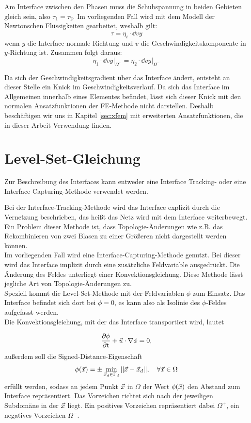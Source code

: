 Am Interface zwischen den Phasen muss die Schubspannung in beiden Gebieten gleich sein, also $\tau_1 = \tau_2$. Im vorliegenden Fall wird mit dem Modell der Newtonschen Flüssigkeiten gearbeitet, weshalb gilt: 
\[\tau = \eta_i\cdot\dd{v}{y}\]
wenn $y$ die Interface-normale Richtung und $v$ die Geschwindigkeitskomponente in $y$-Richtung ist. Zusammen folgt daraus:
\[\eta_1\cdot\dd{v}{y}\biggr|_{\Omega^+} = \eta_2\cdot\dd{v}{y}\biggr|_{\Omega^-}\]

Da sich der Geschwindigkeitsgradient über das Interface ändert, entsteht an dieser Stelle ein Knick im Geschwindigkeitsverlauf. Da sich das Interface im Allgemeinen innerhalb eines Elementes befindet, lässt sich dieser Knick mit den normalen Ansatzfunktionen der FE-Methode nicht darstellen. Deshalb beschäftigen wir uns in Kapitel \ref{sec:xfem} mit erweiterten Ansatzfunktionen, die in dieser Arbeit Verwendung finden.

\section{Level-Set-Gleichung}
Zur Beschreibung des Interfaces kann entweder eine Interface Tracking- oder eine Interface Capturing-Methode verwendet werden.

Bei der Interface-Tracking-Methode wird das Interface explizit durch die
Vernetzung beschrieben, das heißt das Netz wird mit dem Interface weiterbewegt. Ein Problem dieser Methode ist, dass Topologie-Änderungen wie z.B. das Rekombinieren von zwei Blasen zu einer Größeren nicht dargestellt werden können.\\

Im vorliegenden Fall wird eine Interface-Capturing-Methode genutzt. Bei dieser wird das Interface implizit durch eine zusätzliche Feldvariable ausgedrückt. Die Änderung des Feldes unterliegt einer Konvektionsgleichung. Diese Methode lässt jegliche Art von Topologie-Änderungen zu.\\

Speziell kommt die Level-Set-Methode mit der Feldvariablen \(\phi\) zum Einsatz. Das Interface befindet sich dort bei \(\phi = 0\), es kann also als Isolinie des \(\phi\)-Feldes aufgefasst werden.\\

Die Konvektionsgleichung, mit der das Interface transportiert wird, lautet

\begin{equation}
\frac{\partial \phi}{\partial \mathrm{t}} +  \vec{u} \cdot \nabla\phi = 0,
\end{equation}
außerdem soll die Signed-Distance-Eigenschaft
\begin{equation}
 \phi(\vec{x}) = \pm \min_{\vec{x}_d\in\Gamma_d}{||\vec{x}-\vec{x}_d||}, \quad \forall\vec{x} \in \Omega
\end{equation} 
erfüllt werden, sodass an jedem Punkt $\vec{x}$ in $\Omega$ der Wert $\phi(\vec{x})$ den Abstand zum Interface repräsentiert. Das Vorzeichen richtet sich nach der jeweiligen Subdomäne in der $\vec{x}$ liegt. Ein positives Vorzeichen repräsentiert dabei $\Omega^+$, ein negatives Vorzeichen $\Omega^-$.

